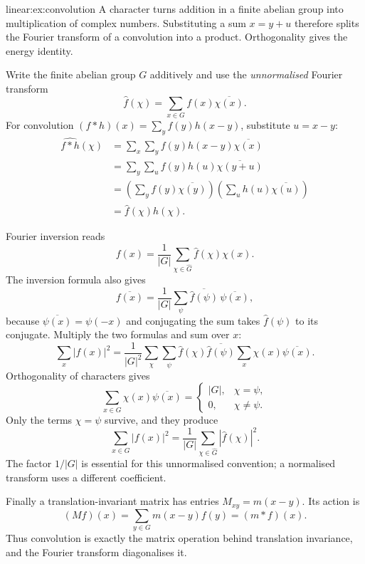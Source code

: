 \begin{solution}{linear:ex:convolution}
\idea A character turns addition in a finite abelian group into multiplication of complex numbers. Substituting a sum $x=y+u$ therefore splits the Fourier transform of a convolution into a product. Orthogonality gives the energy identity.

\writeup Write the finite abelian group $G$ additively and use the \emph{unnormalised} Fourier transform
\[
\hat f(\chi)=\sum_{x\in G}f(x)\overline{\chi(x)}.
\]
For convolution $(f*h)(x)=\sum_y f(y)h(x-y)$, substitute $u=x-y$:
\[
\begin{aligned}
\widehat{f*h}(\chi)
&=\sum_x\sum_y f(y)h(x-y)\overline{\chi(x)}\\
&=\sum_y\sum_u f(y)h(u)\overline{\chi(y+u)}\\
&=\left(\sum_y f(y)\overline{\chi(y)}\right)
  \left(\sum_u h(u)\overline{\chi(u)}\right)\\
&=\boxed{\hat f(\chi)\hat h(\chi)}.
\end{aligned}
\]

Fourier inversion reads
\[
f(x)=\frac1{|G|}\sum_{\chi\in\widehat G}\hat f(\chi)\chi(x).
\]
The inversion formula also gives
\[
\overline{f(x)}
=\frac1{|G|}\sum_{\psi}\overline{\hat f(\psi)}\,\overline{\psi(x)},
\]
because $\overline{\psi(x)}=\psi(-x)$ and conjugating the sum takes $\hat f(\psi)$ to its conjugate. Multiply the two formulas and sum over $x$:
\[
\sum_x|f(x)|^2
=\frac1{|G|^2}\sum_{\chi}\sum_{\psi}
\hat f(\chi)\overline{\hat f(\psi)}
\sum_x\chi(x)\overline{\psi(x)}.
\]
Orthogonality of characters gives
\[
\sum_{x\in G}\chi(x)\overline{\psi(x)}
=\begin{cases}|G|,&\chi=\psi,\\0,&\chi\ne\psi.\end{cases}
\]
Only the terms $\chi=\psi$ survive, and they produce
\[
\boxed{\sum_{x\in G}|f(x)|^2
=\frac1{|G|}\sum_{\chi\in\widehat G}|\hat f(\chi)|^2}.
\]
The factor $1/|G|$ is essential for this unnormalised convention; a normalised transform uses a different coefficient.

Finally a translation-invariant matrix has entries $M_{xy}=m(x-y)$. Its action is
\[
(Mf)(x)=\sum_{y\in G}m(x-y)f(y)=(m*f)(x).
\]
Thus convolution is exactly the matrix operation behind translation invariance, and the Fourier transform diagonalises it.
\end{solution}

